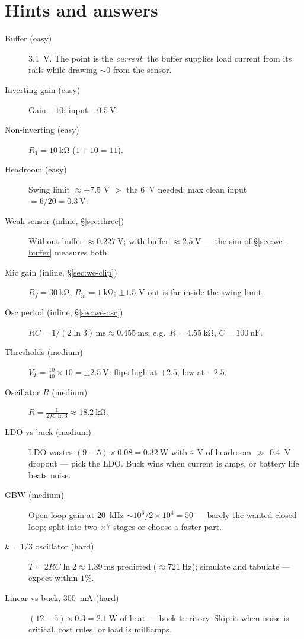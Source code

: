 \section*{Hints and answers}
\begin{description}
\item[Buffer (easy)] \qty{3.1}{\volt}. The point is the \emph{current}:
the buffer supplies load current from its rails while drawing $\sim 0$
from the sensor.
\item[Inverting gain (easy)] Gain $-10$; input $-\qty{0.5}{\volt}$.
\item[Non-inverting (easy)] $R_1 = \qty{10}{\kilo\ohm}$ ($1+10=11$).
\item[Headroom (easy)] Swing limit $\approx \pm 7.5$ V $>$ the
\qty{6}{\volt} needed; max clean input $= 6/20 = \qty{0.3}{\volt}$.
\item[Weak sensor (inline, \S\ref{sec:three})] Without buffer
$\approx \qty{0.227}{\volt}$; with buffer $\approx \qty{2.5}{\volt}$
--- the sim of \S\ref{sec:we-buffer} measures both.
\item[Mic gain (inline, \S\ref{sec:we-clip})] $R_f =
\qty{30}{\kilo\ohm}$, $R_{\mathrm{in}} = \qty{1}{\kilo\ohm}$;
$\pm 1.5$ V out is far inside the swing limit.
\item[Osc period (inline, \S\ref{sec:we-osc})] $RC = 1/(2\ln 3)\,
\mathrm{ms} \approx \qty{0.455}{\milli\second}$; e.g.\
$R = \qty{4.55}{\kilo\ohm}$, $C = \qty{100}{\nano\farad}$.
\item[Thresholds (medium)] $V_T = \frac{10}{40}\times 10 =
\pm\qty{2.5}{\volt}$: flips high at $+2.5$, low at $-2.5$.
\item[Oscillator $R$ (medium)] $R = \frac{1}{2fC\ln 3} \approx
\qty{18.2}{\kilo\ohm}$.
\item[LDO vs buck (medium)] LDO wastes $(9-5)\times 0.08 =
\qty{0.32}{\watt}$ with $4$ V of headroom $\gg$ \qty{0.4}{\volt}
dropout --- pick the LDO. Buck wins when current is amps, or battery
life beats noise.
\item[GBW (medium)] Open-loop gain at \qty{20}{\kilo\hertz} $\sim
10^{6}/2\times10^{4} = 50$ --- barely the wanted closed loop; split into
two $\times 7$ stages or choose a faster part.
\item[$k=1/3$ oscillator (hard)] $T = 2RC\ln 2 \approx
\qty{1.39}{\milli\second}$ predicted ($\approx\qty{721}{\hertz}$);
simulate and tabulate --- expect within $1\%$.
\item[Linear vs buck, \qty{300}{\milli\ampere} (hard)] $(12-5)\times
0.3 = \qty{2.1}{\watt}$ of heat --- buck territory. Skip it when noise
is critical, cost rules, or load is milliamps.
\end{description}
